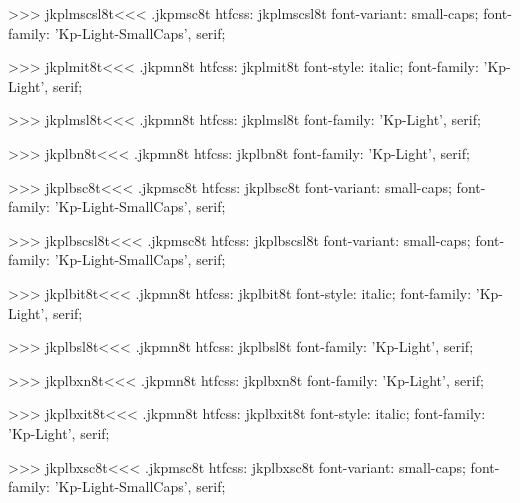 >>>
\<jkplmscsl8t\><<<
.jkpmsc8t
htfcss:  jkplmscsl8t  font-variant: small-caps; font-family: 'Kp-Light-SmallCaps', serif;

>>>
\<jkplmit8t\><<<
.jkpmn8t
htfcss:  jkplmit8t  font-style: italic; font-family: 'Kp-Light', serif;

>>>
\<jkplmsl8t\><<<
.jkpmn8t
htfcss:  jkplmsl8t  font-family: 'Kp-Light', serif;

>>>
\<jkplbn8t\><<<
.jkpmn8t
htfcss:  jkplbn8t  font-family: 'Kp-Light', serif;

>>>
\<jkplbsc8t\><<<
.jkpmsc8t
htfcss:  jkplbsc8t  font-variant: small-caps; font-family: 'Kp-Light-SmallCaps', serif;

>>>
\<jkplbscsl8t\><<<
.jkpmsc8t
htfcss:  jkplbscsl8t  font-variant: small-caps; font-family: 'Kp-Light-SmallCaps', serif;

>>>
\<jkplbit8t\><<<
.jkpmn8t
htfcss:  jkplbit8t  font-style: italic; font-family: 'Kp-Light', serif;

>>>
\<jkplbsl8t\><<<
.jkpmn8t
htfcss:  jkplbsl8t  font-family: 'Kp-Light', serif;

>>>
\<jkplbxn8t\><<<
.jkpmn8t
htfcss:  jkplbxn8t  font-family: 'Kp-Light', serif;

>>>
\<jkplbxit8t\><<<
.jkpmn8t
htfcss:  jkplbxit8t  font-style: italic; font-family: 'Kp-Light', serif;

>>>
\<jkplbxsc8t\><<<
.jkpmsc8t
htfcss:  jkplbxsc8t  font-variant: small-caps; font-family: 'Kp-Light-SmallCaps', serif;

